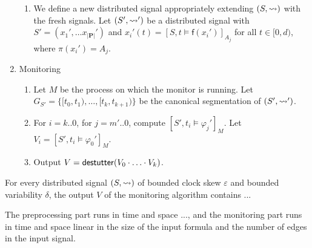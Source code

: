 \begin{enumerate}
\begin{enumerate}[label=\arabic*.]
		\item
		We define a new distributed signal appropriately extending $(S,{\rightsquigarrow})$ with the fresh signals.
		Let $(S', {\rightsquigarrow}')$ be a distributed signal with $S' = (x_1', \ldots x_{|\mathbf{P}|}')$ and $x_i'(t) = [S, t \models \mathsf{f}(x_i')]_{A_j}$ for all $t \in [0,d)$, where $\pi(x_i') = A_j$.
	\end{enumerate}

	\item Monitoring
	\begin{enumerate}[label=\arabic*.]
		\item
		Let $M$ be the process on which the monitor is running.
		Let $G_{S'} = \{ [t_0, t_1), \ldots, [t_k, t_{k+1}) \}$ be the canonical segmentation of $(S', {\rightsquigarrow}')$.
		
		\item
		For $i = k .. 0$, for $j = m' .. 0$, compute $[S', t_i \models \varphi_j']_M$.
		Let $V_i = [S', t_i \models \varphi_0']_M$.
		
		\item
		Output $V = \mathsf{destutter}(V_0 \cdot \ldots \cdot V_k)$.
	\end{enumerate}
\end{enumerate}

\begin{claim}
	For every distributed signal $(S, {\rightsquigarrow})$ of bounded clock skew $\varepsilon$ and bounded variability $\delta$, the output $V$ of the monitoring algorithm contains ... %
\end{claim}

\begin{claim}
	The preprocessing part runs in time and space ..., and the monitoring part runs in time and space linear in the size of the input formula and the number of edges in the input signal. 
\end{claim}
